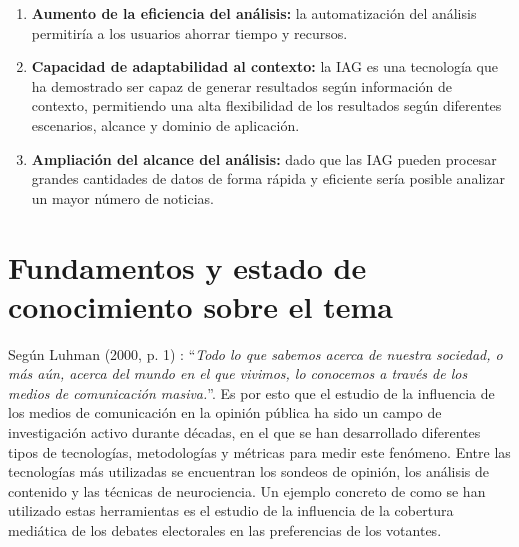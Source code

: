 \documentclass[12pt]{article}
\begin{document}
\begin{enumerate}
    \item \textbf{Aumento de la eficiencia del análisis:} la automatización del análisis permitiría a los usuarios ahorrar tiempo y recursos. 

    \item \textbf{Capacidad de adaptabilidad al contexto:} la IAG es una tecnología que ha demostrado ser capaz de generar resultados según información de contexto, permitiendo una alta flexibilidad de los resultados según diferentes escenarios, alcance y dominio de aplicación. 

    \item \textbf{Ampliación del alcance del análisis:} dado que las IAG pueden procesar grandes cantidades de datos de forma rápida y eficiente sería posible analizar un mayor número de noticias.

\end{enumerate}


\section{Fundamentos y estado de conocimiento sobre el tema}

%


Según Luhman (2000, p. 1) \cite{luhmann2000}: ``\textit{Todo lo que sabemos acerca de nuestra sociedad, o más aún, acerca del mundo en el que vivimos, lo conocemos a través de los medios de comunicación masiva.}''. Es por esto que el estudio de la influencia de los medios de comunicación en la opinión pública ha sido un campo de investigación activo durante décadas, en el que se han desarrollado diferentes tipos de tecnologías, metodologías y métricas para medir este fenómeno. Entre las tecnologías más utilizadas se encuentran los sondeos de opinión, los análisis de contenido y las técnicas de neurociencia. Un ejemplo concreto de como se han utilizado estas herramientas es el estudio de la influencia de la cobertura mediática de los debates electorales en las preferencias de los votantes. 

\end{document}
